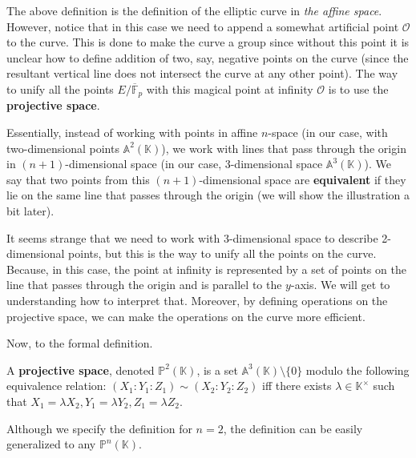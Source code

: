 \documentclass[../../book.tex]{subfiles}
\begin{document}
\vspace{1mm}

The above definition is the definition of the elliptic curve in \textit{the affine space}. However, notice that in this case 
we need to append a somewhat artificial point $\mathcal{O}$ to the curve. This is done to make the curve a group since without 
this point it is unclear how to define addition of two, say, negative points on the curve (since the resultant vertical line
does not intersect the curve at any other point). The way to unify all the points $E/\overline{\mathbb{F}}_p$ with this 
magical point at infinity $\mathcal{O}$ is to use the \textbf{projective space}.

Essentially, instead of working with points in affine $n$-space (in our case, with two-dimensional points $\mathbb{A}^2(\mathbb{K})$), we work with lines that pass through the origin in 
$(n+1)$-dimensional space (in our case, 3-dimensional space $\mathbb{A}^3(\mathbb{K})$). We say that two points from this $(n+1)$-dimensional space are \textbf{equivalent} if they lie on the same line that passes through the origin (we will show the illustration a bit later). 

It seems strange that we need to work with 3-dimensional space to describe 2-dimensional points, but this is the way to unify all the points on the curve. Because, in this case, the point at infinity is represented by a set of points on the line that passes through the origin and is parallel to the
$y$-axis. We will get to understanding how to interpret that. Moreover, by defining operations on the projective space, we can make the operations on the curve more efficient.

Now, to the formal definition.

\vspace{-1.5mm}

\begin{definition}
    A \textbf{projective space}, denoted $\mathbb{P}^2(\mathbb{K})$, is a set $\mathbb{A}^3(\mathbb{K}) \setminus \{0\}$ modulo the following equivalence relation:
    $(X_1:Y_1:Z_1) \sim (X_2:Y_2:Z_2)$ iff there exists $\lambda \in \mathbb{K}^{\times}$
    such that $X_1=\lambda X_2, Y_1=\lambda Y_2, Z_1 = \lambda Z_2$.
\end{definition}

\begin{remark}
    Although we specify the definition for $n=2$, the definition can be easily generalized to any $\mathbb{P}^n(\mathbb{K})$.
\end{remark}
\end{document}
